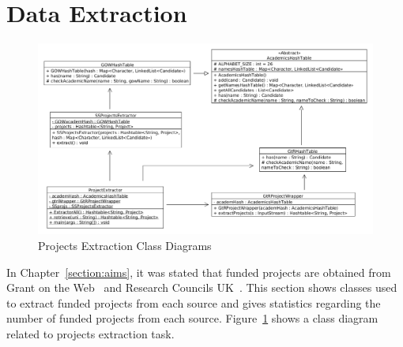 \section{Data Extraction}\label{sec:dataextraction}
\begin{figure}
\centering
\includegraphics[scale=0.35]{./figures/projectsExtraction.png}
\caption{Projects Extraction Class Diagrams} \label{fig:projectsExtraction} 
\end{figure}
In Chapter~\ref{section:aims}, it was stated that funded projects are obtained from Grant on the Web~\cite{gow} and Research Councils UK~\cite{gtr}.
This section shows classes used to extract funded projects from each source and gives statistics regarding the number of funded projects from each source.
Figure~\ref{fig:projectsExtraction} shows a class diagram related to projects extraction task.


